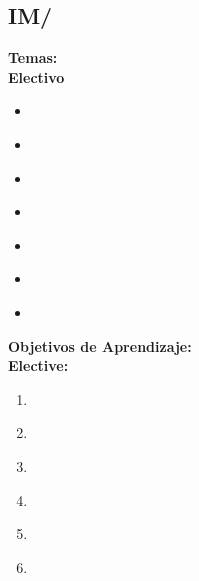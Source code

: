 \subsection{IM/\IMMultimediaSystems}\label{sec:BOK:IMMultimediaSystems}
\noindent \textbf{Temas:}\\
\noindent \textbf{Electivo}
\begin{itemize}
	\item \IMMultimediaSystemsTopicInput\label{sec:BOK:IMMultimediaSystemsTopicInput}
	\item \IMMultimediaSystemsTopicStandards\label{sec:BOK:IMMultimediaSystemsTopicStandards}
	\item \IMMultimediaSystemsTopicApplications\label{sec:BOK:IMMultimediaSystemsTopicApplications}
	\item \IMMultimediaSystemsTopicStreams\label{sec:BOK:IMMultimediaSystemsTopicStreams}
	\item \IMMultimediaSystemsTopicContent\label{sec:BOK:IMMultimediaSystemsTopicContent}
	\item \IMMultimediaSystemsTopicPresentation\label{sec:BOK:IMMultimediaSystemsTopicPresentation}
	\item \IMMultimediaSystemsTopicReal\label{sec:BOK:IMMultimediaSystemsTopicReal}
\end{itemize}


\noindent \textbf{Objetivos de Aprendizaje:}\\
\noindent \textbf{Elective:}
\begin{enumerate}
	\setcounter{enumi}{0}
	\item \IMMultimediaSystemsLODescribeTheSupporting\xspace[\IMMultimediaSystemsLODescribeTheSupportingLevel]\label{sec:BOK:IMMultimediaSystemsLODescribeTheSupporting}
	\item \IMMultimediaSystemsLODemonstrateTheContent\xspace[\IMMultimediaSystemsLODemonstrateTheContentLevel]\label{sec:BOK:IMMultimediaSystemsLODemonstrateTheContent}
	\item \IMMultimediaSystemsLOCritiqueMultimedia\xspace[\IMMultimediaSystemsLOCritiqueMultimediaLevel]\label{sec:BOK:IMMultimediaSystemsLOCritiqueMultimedia}
	\item \IMMultimediaSystemsLOImplementAUsing\xspace[\IMMultimediaSystemsLOImplementAUsingLevel]\label{sec:BOK:IMMultimediaSystemsLOImplementAUsing}
	\item \IMMultimediaSystemsLOForEachMedia\xspace[\IMMultimediaSystemsLOForEachMediaLevel]\label{sec:BOK:IMMultimediaSystemsLOForEachMedia}
	\item \IMMultimediaSystemsLODescribeTheAIncluding\xspace[\IMMultimediaSystemsLODescribeTheAIncludingLevel]\label{sec:BOK:IMMultimediaSystemsLODescribeTheAIncluding}
\end{enumerate}




